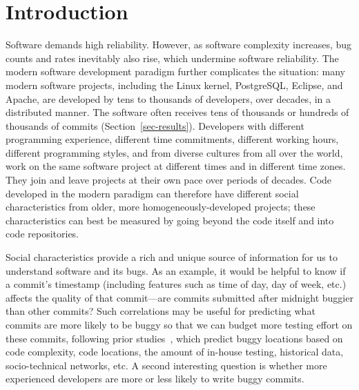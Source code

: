 
\section{Introduction}

Software demands high reliability. However, as software complexity increases,
bug counts and rates inevitably also rise, which undermine software reliability.
The modern software development paradigm further complicates the situation: many
modern software projects, including the Linux kernel, PostgreSQL, Eclipse, and
Apache, are developed by tens to thousands of developers, over decades, in a
distributed manner. The software often receives tens of thousands or hundreds of
thousands of commits (Section~\ref{sec-results}).  Developers with different
programming experience, different time commitments, different working hours,
different programming styles, and from diverse cultures from all over the world,
work on the same software project at different times and in different time
zones. They join and leave projects at their own pace over periods of decades.
Code developed in the modern paradigm can therefore have different social
characteristics from older, more homogeneously-developed projects; these
characteristics can best be measured by going beyond the code itself and into
code repositories.

Social characteristics provide a rich and unique source of information for us to
understand software and its bugs. As an example, it would be helpful to know if
a commit's timestamp (including features such as time of day, day of week, etc.)
affects the quality of that commit---are commits submitted after midnight
buggier than other commits?  Such correlations may be useful for predicting what
commits are more likely to be buggy so that we can budget more testing effort on
these commits, following prior studies~\cite{graves00predicting, guo04robust,
Hassan09, libre07, devNetwork08, predictionMenzies10, effort03,
ostrand05predicting, depGraph08, zimmermann-promise-2007}, which predict buggy
locations based on code complexity, code locations, the amount of in-house
testing, historical data, socio-technical networks, etc.  A second interesting
question is whether more experienced developers are more or less likely to write
buggy commits.


